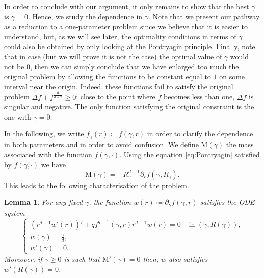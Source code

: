 \documentclass[11pt,a4paper]{article}
\numberwithin{equation}{section}
\theoremstyle{plain}
\newtheorem{lemma}[theorem]{Lemma}
\theoremstyle{remark}
\begin{document}
In order to conclude with our argument, it only remains to show that the best $\gamma$ is $\gamma=0$. Hence, we study the dependence in $\gamma$. Note that we present our pathway as a reduction to a one-parameter problem since we believe that it is easier to understand, but, as we will see later, the optimality conditions in terms of $\gamma$ could also be obtained by only looking at the Pontryagin principle. Finally, note that in case (but we will prove it is not the case) the optimal value of $\gamma$ would not be $0$, then we can simply conclude that we have enlarged too much the original problem by allowing the functions to be constant equal to $1$ on some interval near the origin. Indeed, these functions fail to satisfy the original problem $ \Delta f + f^\frac{d}{d-2}\ge 0$: close to the point where $f$ becomes less than one, $\Delta f$ is singular and negative. The only function satisfying the original constraint is the one with $\gamma=0$. %



In the following, we write $f_{\gamma}(r) \coloneqq f(\gamma,r)$ in order to clarify the dependence in both parameters and in order to avoid confusion. 
%
We define $\mathrm{M}(\gamma)$ the mass associated with the function $f (\gamma, \cdot)$. Using the equation \eqref{eq:Pontryagin} satisfied by $f (\gamma, \cdot)$ we have
$$
    \mathrm{M}(\gamma) =-   R_{\gamma}^{d-1} \partial_r f (\gamma,R_{\gamma} ).
$$
This leads to the following characterisation of the problem.

\begin{lemma}
For any fixed $\gamma$, the function $w (r) \coloneqq \partial_\gamma f (\gamma , r)$ satisfies the ODE system 
\begin{equation}
\label{system for v}
\begin{cases}
    (r^{d-1}w'(r))'+qf^{q-1}(\gamma , r)r^{d-1}w(r)=0 & \mbox{ in }(\gamma,R(\gamma)),\\
    w(\gamma)=\frac\gamma d , &\\
    w'(\gamma)=0. &
\end{cases}
\end{equation}
Moreover, if $\gamma\geq 0$ is such that $\mathrm{M}'(\gamma) =0$ then, $w$ also satisfies $w'(R(\gamma)) = 0$.
\end{lemma}
\end{document}
